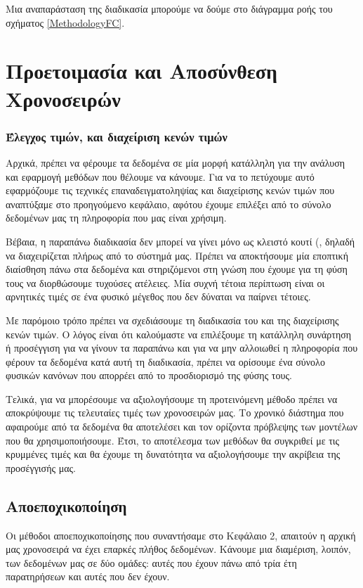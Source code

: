 Μια αναπαράσταση της διαδικασία μπορούμε να δούμε στο διάγραμμα ροής του σχήματος \ref{MethodologyFC}.

\section{Προετοιμασία και Αποσύνθεση Χρονοσειρών}

\subsubsection{Έλεγχος τιμών,  και διαχείριση κενών τιμών}
Αρχικά, πρέπει να φέρουμε τα δεδομένα σε μία μορφή κατάλληλη για την ανάλυση και εφαρμογή μεθόδων που θέλουμε να κάνουμε. Για να το πετύχουμε αυτό εφαρμόζουμε τις τεχνικές επαναδειγματοληψίας και διαχείρισης κενών τιμών που αναπτύξαμε στο προηγούμενο κεφάλαιο, αφότου έχουμε επιλέξει από το σύνολο δεδομένων μας τη πληροφορία που μας είναι χρήσιμη. 

Βέβαια, η παραπάνω διαδικασία δεν μπορεί να γίνει μόνο ως κλειστό κουτί (, δηλαδή να διαχειρίζεται πλήρως από το σύστημά μας. Πρέπει να αποκτήσουμε μία εποπτική διαίσθηση πάνω στα δεδομένα και στηριζόμενοι στη γνώση που έχουμε για τη φύση τους να διορθώσουμε τυχούσες ατέλειες. Μία συχνή τέτοια περίπτωση είναι οι αρνητικές τιμές σε ένα φυσικό μέγεθος που δεν δύναται να παίρνει τέτοιες. 

Με παρόμοιο τρόπο πρέπει να σχεδιάσουμε τη διαδικασία του  και της διαχείρισης κενών τιμών. Ο λόγος είναι ότι καλούμαστε να επιλέξουμε τη κατάλληλη συνάρτηση ή προσέγγιση για να γίνουν τα παραπάνω και για να μην αλλοιωθεί η πληροφορία που φέρουν τα δεδομένα κατά αυτή τη διαδικασία, πρέπει να ορίσουμε ένα σύνολο φυσικών κανόνων που απορρέει από το προσδιορισμό της φύσης τους.

Τελικά, για να μπορέσουμε να αξιολογήσουμε τη προτεινόμενη μέθοδο πρέπει να αποκρύψουμε τις τελευταίες τιμές των χρονοσειρών μας. Το χρονικό διάστημα που αφαιρούμε από τα δεδομένα θα αποτελέσει και τον ορίζοντα πρόβλεψης των μοντέλων που θα χρησιμοποιήσουμε. Έτσι, το αποτέλεσμα των μεθόδων θα συγκριθεί με τις κρυμμένες τιμές και θα έχουμε τη δυνατότητα να αξιολογήσουμε την ακρίβεια της προσέγγισής μας.

\subsection{Αποεποχικοποίηση}

Οι μέθοδοι αποεποχικοποίησης που συναντήσαμε στο Κεφάλαιο 2, απαιτούν η αρχική μας χρονοσειρά να έχει επαρκές πλήθος δεδομένων. Κάνουμε μια διαμέριση, λοιπόν, των δεδομένων μας σε δύο ομάδες: αυτές που έχουν πάνω από τρία έτη παρατηρήσεων και αυτές που δεν έχουν. 

